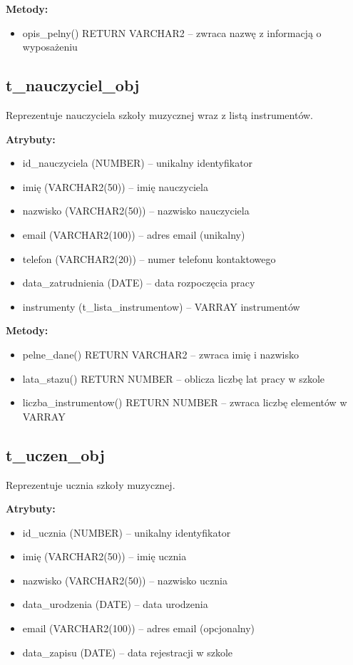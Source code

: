 \documentclass[12pt,a4paper]{article}
\begin{document}
\textbf{Metody:}
\begin{itemize}[nosep]
    \item opis\_pelny() RETURN VARCHAR2 -- zwraca nazwę z informacją o wyposażeniu
\end{itemize}

\subsection{t\_nauczyciel\_obj}

Reprezentuje nauczyciela szkoły muzycznej wraz z listą instrumentów.

\textbf{Atrybuty:}
\begin{itemize}[nosep]
    \item id\_nauczyciela (NUMBER) -- unikalny identyfikator
    \item imię (VARCHAR2(50)) -- imię nauczyciela
    \item nazwisko (VARCHAR2(50)) -- nazwisko nauczyciela
    \item email (VARCHAR2(100)) -- adres email (unikalny)
    \item telefon (VARCHAR2(20)) -- numer telefonu kontaktowego
    \item data\_zatrudnienia (DATE) -- data rozpoczęcia pracy
    \item instrumenty (t\_lista\_instrumentow) -- VARRAY instrumentów
\end{itemize}

\textbf{Metody:}
\begin{itemize}[nosep]
    \item pelne\_dane() RETURN VARCHAR2 -- zwraca imię i nazwisko
    \item lata\_stazu() RETURN NUMBER -- oblicza liczbę lat pracy w szkole
    \item liczba\_instrumentow() RETURN NUMBER -- zwraca liczbę elementów w VARRAY
\end{itemize}

\subsection{t\_uczen\_obj}

Reprezentuje ucznia szkoły muzycznej.

\textbf{Atrybuty:}
\begin{itemize}[nosep]
    \item id\_ucznia (NUMBER) -- unikalny identyfikator
    \item imię (VARCHAR2(50)) -- imię ucznia
    \item nazwisko (VARCHAR2(50)) -- nazwisko ucznia
    \item data\_urodzenia (DATE) -- data urodzenia
    \item email (VARCHAR2(100)) -- adres email (opcjonalny)
    \item data\_zapisu (DATE) -- data rejestracji w szkole
\end{itemize}
\end{document}
